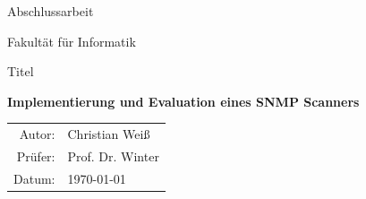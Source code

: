 \documentclass[11pt,a4paper]{article}
\begin{document}
\begin{center}
	
	\begin{Huge}
		Abschlussarbeit\linebreak
	\end{Huge}
	
	\vspace{\fill}
	
	\begin{Large}
		Fakultät für Informatik\linebreak
	\end{Large}
	
	\vspace{\fill}
	
	\begin{LARGE}
		Titel\linebreak
	\end{LARGE}
	
	\vspace{1cm}
	
	\begin{Huge}
		\textbf{Implementierung und Evaluation eines SNMP Scanners}\linebreak
	\end{Huge}
	
	\vspace{\fill}
	
	\begin{Large}
		\begin{tabular}{r l}
			Autor: & Christian Weiß \\
			Prüfer: & Prof. Dr. Winter \\
			Datum: & \today \\
		\end{tabular}
	\end{Large}
	
\end{center}	%
\pagebreak

\tableofcontents

\end{document}

